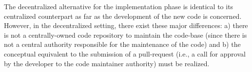 
The decentralized alternative for the implementation phase is identical to its
centralized counterpart as far as the development of the new code is concerned.
However, in the decentralized setting, there exist these major differences:
a) there is not a centrally-owned code repository to maintain the code-base
(since there is not a central authority responsible for the maintenance of the
code) and b) the conceptual equivalent to the submission of a pull-request
(i.e., a call for approval by the developer to the code maintainer authority)
must be realized.

%


